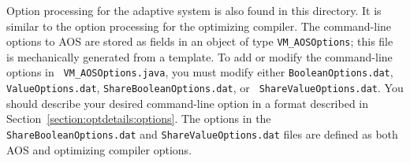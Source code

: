 Option processing for the adaptive system is also found in this
directory.  It is similar to the option processing for the optimizing
compiler.  The command-line options to AOS are
stored as fields in an object of type {\tt VM\_AOSOptions}; this file
is mechanically generated from a template.
To add or modify the command-line options in {\tt
VM\_AOSOptions.java}, you must modify either {\tt BooleanOptions.dat},
{\tt ValueOptions.dat}, {\tt ShareBooleanOptions.dat}, or {\tt
ShareValueOptions.dat}.  You should describe your desired command-line
option in a format described in
Section~\ref{section:optdetails:options}.  The options in the {\tt
ShareBooleanOptions.dat} and {\tt ShareValueOptions.dat} files are
defined as both AOS and optimizing compiler options.


